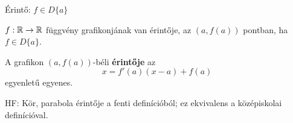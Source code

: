 \documentclass[a4paper,11.5pt]{article}
\begin{document}
	\begin{revision}
		Érintő: $f\in D\{a\}$
		\begin{figure}[H]
			\centering
			\caption{}\label{}
		\end{figure}
	\end{revision}
	\begin{definition}
		$f:\mathbb{R}\to\mathbb{R}$ függvény grafikonjának van érintője, az $(a,f(a))$ pontban, ha $f\in D\{a\}$.
		
		\smallskip
		A grafikon $(a,f(a))$-béli \textbf{érintője} az
		\[ x=f'(a)(x-a)+f(a) \]
		egyenletű egyenes.
	\end{definition}
	\begin{note}
		HF: Kör, parabola érintője a fenti definícióból; ez ekvivalens a középiskolai definícióval.
	\end{note}
\end{document}
